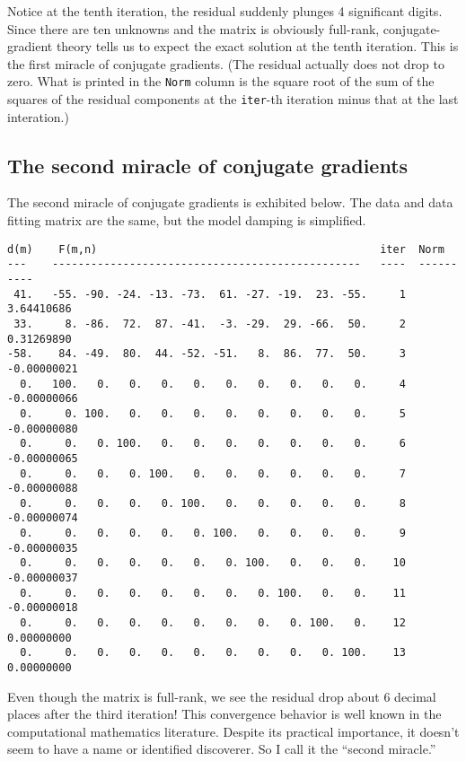 \par
Notice at the tenth iteration,
the residual suddenly plunges 4 significant digits.
Since there are ten unknowns and the matrix is obviously full-rank,
conjugate-gradient theory tells us to expect
the exact solution at the tenth iteration.
This is the first miracle of conjugate gradients.
(The residual actually does not drop to zero.
What is printed in the \texttt{Norm} column
is the square root of the sum of the squares
of the residual components at the \texttt{iter}-th
iteration minus that at the last interation.)


\subsection{The second miracle of conjugate gradients}

The second miracle of conjugate gradients is exhibited below.
The data and data fitting matrix are the same,
but the model damping is simplified.

\par\noindent
\footnotesize
\begin{verbatim}
d(m)    F(m,n)                                            iter  Norm
---    ------------------------------------------------   ----  ----------
 41.   -55. -90. -24. -13. -73.  61. -27. -19.  23. -55.     1  3.64410686
 33.     8. -86.  72.  87. -41.  -3. -29.  29. -66.  50.     2  0.31269890
-58.    84. -49.  80.  44. -52. -51.   8.  86.  77.  50.     3 -0.00000021
  0.   100.   0.   0.   0.   0.   0.   0.   0.   0.   0.     4 -0.00000066
  0.     0. 100.   0.   0.   0.   0.   0.   0.   0.   0.     5 -0.00000080
  0.     0.   0. 100.   0.   0.   0.   0.   0.   0.   0.     6 -0.00000065
  0.     0.   0.   0. 100.   0.   0.   0.   0.   0.   0.     7 -0.00000088
  0.     0.   0.   0.   0. 100.   0.   0.   0.   0.   0.     8 -0.00000074
  0.     0.   0.   0.   0.   0. 100.   0.   0.   0.   0.     9 -0.00000035
  0.     0.   0.   0.   0.   0.   0. 100.   0.   0.   0.    10 -0.00000037
  0.     0.   0.   0.   0.   0.   0.   0. 100.   0.   0.    11 -0.00000018
  0.     0.   0.   0.   0.   0.   0.   0.   0. 100.   0.    12  0.00000000
  0.     0.   0.   0.   0.   0.   0.   0.   0.   0. 100.    13  0.00000000
\end{verbatim}
\normalsize
\par\noindent
Even though the matrix is full-rank,
we see the residual drop about 6 decimal places after the third iteration!
This convergence behavior is well known
in the computational mathematics literature.
Despite its practical importance,
it doesn't seem to have a name or identified discoverer.
So I call it the ``second miracle.''

